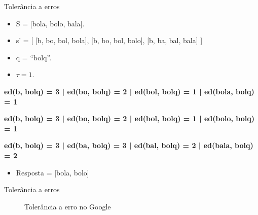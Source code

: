 \documentclass[11pt]{beamer}
\begin{document}
\begin{frame}{Tolerância a erros}
	\begin{itemize}
		\item S = [bola, bolo, bala]. 
		\item s’ = [ [b, bo, bol, bola], [b, bo, bol, bolo], [b, ba, bal, bala] ]
		\item q = ``bolq''.
		\item $\tau = 1$.
	\end{itemize}
	
	\textbf{ed(b, bolq) = 3 | ed(bo, bolq) = 2 | ed(bol, bolq) = 1 | ed(bola, bolq) = 1}
	
    \textbf{ed(b, bolq) = 3 | ed(bo, bolq) = 2 | ed(bol, bolq) = 1 | ed(bolo, bolq) = 1}
    
    \textbf{ed(b, bolq) = 3 | ed(ba, bolq) = 3 | ed(bal, bolq) = 2 | ed(bala, bolq) = 2}
    
    \pause
    \begin{itemize}
        \item Resposta = [bola, bolo]
    \end{itemize}
\end{frame}

\begin{frame}{Tolerância a erros}
    \begin{figure}
        \centering
        \caption{Tolerância a erro no Google}
        \label{fig:fig}
    \end{figure}

\end{frame}
\end{document}
